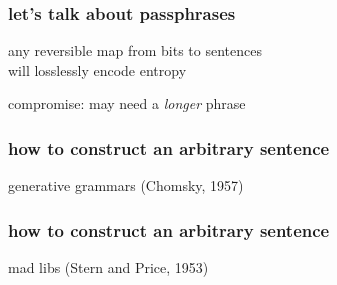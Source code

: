 \documentclass[xetex]{beamer}
\begin{document}
\begin{frame}
\frametitle{let's talk about passphrases}

\begin{center}
any reversible map from bits to sentences \\ will losslessly encode entropy

\vspace{1.5cm}

\pause compromise: may need a \emph{longer} phrase
\end{center}
\end{frame}



\begin{frame}
\frametitle{how to construct an arbitrary sentence}

generative grammars (Chomsky, 1957)

\begin{center}
%
\quad\quad\quad%
%
\end{center}

\end{frame}



\begin{frame}
\frametitle{how to construct an arbitrary sentence}

mad libs (Stern and Price, 1953)

\begin{center}
%
\end{center}

\end{frame}
\end{document}
